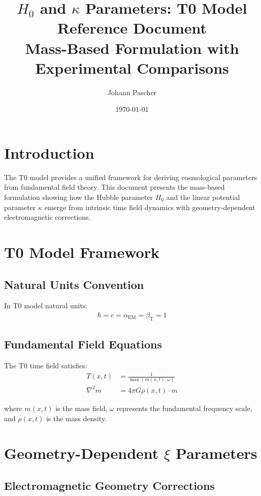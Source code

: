 \documentclass[12pt,a4paper]{article}
\title{$H_0$ and $\kappa$ Parameters: T0 Model Reference Document\\
	Mass-Based Formulation with Experimental Comparisons}
\author{Johann Pascher}
\date{\today}
\begin{document}
	
	\maketitle
	
	\section{Introduction}
	
	The T0 model provides a unified framework for deriving cosmological parameters from fundamental field theory. This document presents the mass-based formulation showing how the Hubble parameter $H_0$ and the linear potential parameter $\kappa$ emerge from intrinsic time field dynamics with geometry-dependent electromagnetic corrections.
	
	\section{T0 Model Framework}
	
	\subsection{Natural Units Convention}
	In T0 model natural units:
	\begin{align}
		\hbar = c = \alpha_{\text{EM}} = \beta_{\text{T}} = 1
	\end{align}
	
	\subsection{Fundamental Field Equations}
	The T0 time field satisfies:
	\begin{align}
		T(x,t) &= \frac{1}{\max(m(x,t), \omega)} \\
		\nabla^2 m &= 4\pi G \rho(x,t) \cdot m
	\end{align}
	
	where $m(x,t)$ is the mass field, $\omega$ represents the fundamental frequency scale, and $\rho(x,t)$ is the mass density.
	
	\section{Geometry-Dependent $\xi$ Parameters}
	
	\subsection{Electromagnetic Geometry Corrections}
	
\end{document}
